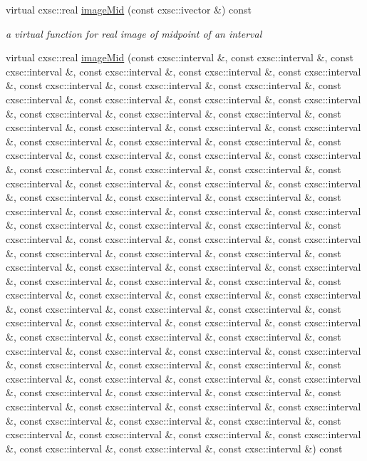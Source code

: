 \begin{DoxyCompactItemize}
virtual cxsc\-::real \hyperlink{classsubpavings_1_1MappedFobj100D_a055b113cf48f62a55175038b64e2c6ac}{image\-Mid} (const cxsc\-::ivector \&) const 
\begin{DoxyCompactList}\small\item\em a virtual function for real image of midpoint of an interval \end{DoxyCompactList}\item 
virtual cxsc\-::real \hyperlink{classsubpavings_1_1MappedFobj100D_a20ebd733b7254a0ea2ef36e1920597e0}{image\-Mid} (const cxsc\-::interval \&, const cxsc\-::interval \&, const cxsc\-::interval \&, const cxsc\-::interval \&, const cxsc\-::interval \&, const cxsc\-::interval \&, const cxsc\-::interval \&, const cxsc\-::interval \&, const cxsc\-::interval \&, const cxsc\-::interval \&, const cxsc\-::interval \&, const cxsc\-::interval \&, const cxsc\-::interval \&, const cxsc\-::interval \&, const cxsc\-::interval \&, const cxsc\-::interval \&, const cxsc\-::interval \&, const cxsc\-::interval \&, const cxsc\-::interval \&, const cxsc\-::interval \&, const cxsc\-::interval \&, const cxsc\-::interval \&, const cxsc\-::interval \&, const cxsc\-::interval \&, const cxsc\-::interval \&, const cxsc\-::interval \&, const cxsc\-::interval \&, const cxsc\-::interval \&, const cxsc\-::interval \&, const cxsc\-::interval \&, const cxsc\-::interval \&, const cxsc\-::interval \&, const cxsc\-::interval \&, const cxsc\-::interval \&, const cxsc\-::interval \&, const cxsc\-::interval \&, const cxsc\-::interval \&, const cxsc\-::interval \&, const cxsc\-::interval \&, const cxsc\-::interval \&, const cxsc\-::interval \&, const cxsc\-::interval \&, const cxsc\-::interval \&, const cxsc\-::interval \&, const cxsc\-::interval \&, const cxsc\-::interval \&, const cxsc\-::interval \&, const cxsc\-::interval \&, const cxsc\-::interval \&, const cxsc\-::interval \&, const cxsc\-::interval \&, const cxsc\-::interval \&, const cxsc\-::interval \&, const cxsc\-::interval \&, const cxsc\-::interval \&, const cxsc\-::interval \&, const cxsc\-::interval \&, const cxsc\-::interval \&, const cxsc\-::interval \&, const cxsc\-::interval \&, const cxsc\-::interval \&, const cxsc\-::interval \&, const cxsc\-::interval \&, const cxsc\-::interval \&, const cxsc\-::interval \&, const cxsc\-::interval \&, const cxsc\-::interval \&, const cxsc\-::interval \&, const cxsc\-::interval \&, const cxsc\-::interval \&, const cxsc\-::interval \&, const cxsc\-::interval \&, const cxsc\-::interval \&, const cxsc\-::interval \&, const cxsc\-::interval \&, const cxsc\-::interval \&, const cxsc\-::interval \&, const cxsc\-::interval \&, const cxsc\-::interval \&, const cxsc\-::interval \&, const cxsc\-::interval \&, const cxsc\-::interval \&, const cxsc\-::interval \&, const cxsc\-::interval \&, const cxsc\-::interval \&, const cxsc\-::interval \&, const cxsc\-::interval \&, const cxsc\-::interval \&, const cxsc\-::interval \&, const cxsc\-::interval \&, const cxsc\-::interval \&, const cxsc\-::interval \&, const cxsc\-::interval \&, const cxsc\-::interval \&, const cxsc\-::interval \&, const cxsc\-::interval \&, const cxsc\-::interval \&, const cxsc\-::interval \&, const cxsc\-::interval \&, const cxsc\-::interval \&) const 

\end{DoxyCompactItemize}
